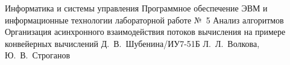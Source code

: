 \makereporttitle
    {Информатика и системы управления} %
    {Программное обеспечение ЭВМ и информационные технологии} %
    {лабораторной работе №~5} %
    {Анализ алгоритмов} %
    {Организация асинхронного взаимодействия потоков вычисления на примере конвейерных вычислений} %
    {} %
    {Д.~В.~Шубенина/ИУ7-51Б} %
	{Л.~Л.~Волкова, Ю.~В.~Строганов} %